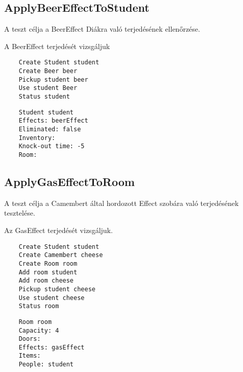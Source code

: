 \subsection{ApplyBeerEffectToStudent}
\begin{test-case-description}
    A teszt célja a BeerEffect Diákra való terjedésének ellenőrzése.
\end{test-case-description}
\begin{test-case-function}
    A BeerEffect terjedését vizsgáljuk
\end{test-case-function}
\begin{test-case-input}
    \begin{verbatim}
    Create Student student
    Create Beer beer
    Pickup student beer
    Use student Beer
    Status student
    \end{verbatim}
\end{test-case-input}
\begin{test-case-output}
    \begin{verbatim}
    Student student
    Effects: beerEffect
    Eliminated: false
    Inventory:
    Knock-out time: -5
    Room:
    \end{verbatim}
\end{test-case-output}

\subsection{ApplyGasEffectToRoom}
\begin{test-case-description}
    A teszt célja a Camembert által hordozott Effect szobára való terjedésének tesztelése.
\end{test-case-description}
\begin{test-case-function}
    Az GasEffect terjedését vizsgáljuk.
\end{test-case-function}
\begin{test-case-input}
    \begin{verbatim}
    Create Student student
    Create Camembert cheese
    Create Room room
    Add room student 
    Add room cheese
    Pickup student cheese
    Use student cheese
    Status room
    \end{verbatim}
\end{test-case-input}
\begin{test-case-output}
    \begin{verbatim}
    Room room
    Capacity: 4
    Doors:
    Effects: gasEffect
    Items:
    People: student
    \end{verbatim}
\end{test-case-output}

